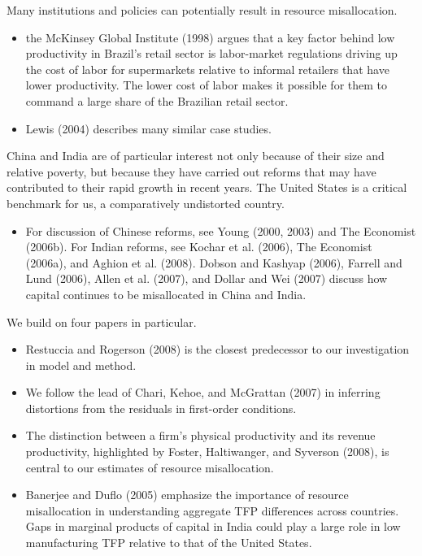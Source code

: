 \documentclass{article}
\begin{document}
Many institutions and policies can potentially result in resource misallocation. 
\begin{itemize}
    \item the McKinsey Global Institute (1998) argues that a key factor behind low productivity in Brazil’s retail sector is labor-market regulations driving up the cost of labor for supermarkets relative to informal retailers that have lower productivity. The lower cost of labor makes it possible for them to command a large share of the Brazilian retail sector.
    \item Lewis (2004) describes many similar case studies.
\end{itemize}

China and India are of particular interest not only because of their size and relative poverty, but because they have carried out reforms that may have contributed to their rapid growth in recent years. The United States is a critical benchmark for us, a comparatively undistorted country.

\begin{itemize}
    \item For discussion of Chinese reforms, see Young (2000, 2003) and The Economist (2006b). For Indian reforms, see Kochar et al. (2006), The Economist (2006a), and Aghion et al. (2008). Dobson and Kashyap (2006), Farrell and Lund (2006), Allen et al. (2007), and Dollar and Wei (2007) discuss how capital continues to be misallocated in China and India.
\end{itemize}

We build on four papers in particular.
\begin{itemize}
    \item Restuccia and Rogerson (2008) is the closest predecessor to our investigation in model and method.
    \item We follow the lead of Chari, Kehoe, and McGrattan (2007) in inferring distortions from the residuals in first-order conditions.
    \item The distinction between a firm’s physical productivity and its revenue productivity, highlighted by Foster, Haltiwanger, and Syverson (2008), is central to our estimates of resource misallocation.
    \item Banerjee and Duflo (2005) emphasize the importance of resource misallocation in understanding aggregate TFP differences across countries. Gaps in marginal products of capital in India could play a large role in low manufacturing TFP relative to that of the United States.
\end{itemize}
\end{document}
